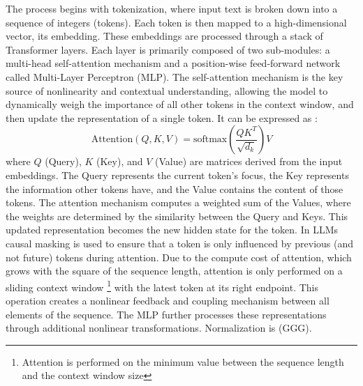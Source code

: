 \documentclass[a4paper,12pt]{article}
\begin{document}
The process begins with tokenization, where input text is broken down into a sequence of integers (tokens). Each token is then mapped to a high-dimensional vector, its embedding. These embeddings are processed through a stack of Transformer layers. Each layer is primarily composed of two sub-modules: a multi-head self-attention mechanism and a position-wise feed-forward network called Multi-Layer Perceptron (MLP). The self-attention mechanism is the key source of nonlinearity and contextual understanding, allowing the model to dynamically weigh the importance of all other tokens in the context window, and then update the representation of a single token. It can be expressed as \cite{attention}:
\begin{equation}
    \text{Attention}(Q, K, V) = \text{softmax}\left(\frac{QK^T}{\sqrt{d_k}}\right)V
\end{equation}
where $Q$ (Query), $K$ (Key), and $V$ (Value) are matrices derived from the input embeddings. The Query represents the current token's focus, the Key represents the information other tokens have, and the Value contains the content of those tokens. The attention mechanism computes a weighted sum of the Values, where the weights are determined by the similarity between the Query and Keys. This updated representation becomes the new hidden state for the token.
In LLMs causal masking is used to ensure that a token is only influenced by previous (and not future) tokens during attention. Due to the compute cost of attention, which grows with the square of the sequence length, attention is only performed on a sliding context window \footnote{Attention is performed on the minimum value between the sequence length and the context window size} with the latest token at its right endpoint.
This operation creates a nonlinear feedback and coupling mechanism between all elements of the sequence. The MLP further processes these representations through additional nonlinear transformations. Normalization is (GGG). 
\end{document}
